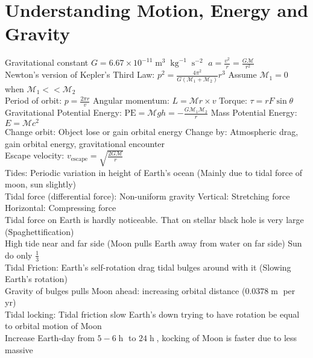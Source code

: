 \documentclass{article}
\DeclareMathOperator{\s}{s}
\DeclareMathOperator{\h}{h}
\DeclareMathOperator{\m}{m}
\DeclareMathOperator{\kg}{kg}
\begin{document}
\section{Understanding Motion, Energy and Gravity}
Gravitational constant $G=6.67\times 10^{-11}\m^{3}\kg^{-1}\s^{-2}$ \quad $a=\frac{v^{2}}{r}=\frac{G\mathcal{M}}{r^{2}}$\\
Newton's version of Kepler's Third Law: $p^{2}=\frac{4\pi^{2}}{G(\mathcal{M}_{1}+\mathcal{M}_{2})}r^{3}$ \quad Assume $\mathcal{M}_{1}=0$ when $\mathcal{M}_{1}<<\mathcal{M}_{2}$\\
Period of orbit: $p=\frac{2\pi r}{v}$ \quad Angular momentum: $L=\mathcal{M}r\times v$ \quad Torque: $\tau=rF\sin{\theta}$\\
Gravitational Potential Energy: $\text{PE}=\mathcal{M}gh=-\frac{G\mathcal{M}_{1}\mathcal{M}_{2}}{r}$ \quad Mass Potential Energy: $E=\mathcal{M}c^{2}$\\
Change orbit: Object lose or gain orbital energy \quad Change by: Atmospheric drag, gain orbital energy, gravitational encounter\\
Escape velocity: $v_{\text{escape}}=\sqrt{\frac{2G\mathcal{M}}{r}}$\\
Tides: Periodic variation in height of Earth's ocean (Mainly due to tidal force of moon, sun slightly)\\
Tidal force (differential force): Non-uniform gravity \quad Vertical: Stretching force \quad Horizontal: Compressing force\\
Tidal force on Earth is hardly noticeable. That on stellar black hole is very large (Spaghettification)\\
High tide near and far side (Moon pulls Earth away from water on far side) \quad Sun do only $\frac{1}{3}$\\
Tidal Friction: Earth's self-rotation drag tidal bulges around with it (Slowing Earth's rotation)\\
Gravity of bulges pulls Moon ahead: increasing orbital distance ($0.0378\m$ per yr)\\
Tidal locking: Tidal friction slow Earth's down trying to have rotation be equal to orbital motion of Moon\\
Increase Earth-day from $5-6\h$ to $24\h$, kocking of Moon is faster due to less massive
\end{document}
